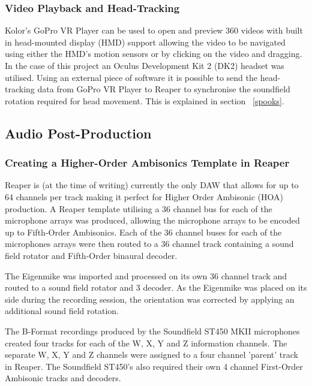 			\subsubsection{Video Playback and Head-Tracking}
				 Kolor's GoPro VR Player \cite{GoProVR} can be used to open and preview 360 videos with built in head-mounted display (HMD) support allowing the video to be navigated using either the HMD's motion sensors or by clicking on the video and dragging. In the case of this project an Oculus Development Kit 2 (DK2) \cite{OculusDK2} headset was utilised. Using an external piece of software it is possible to send the head-tracking data from GoPro VR Player to Reaper to synchronise the soundfield rotation required for head movement. This is explained in section ~\ref{spooks}.


		\subsection{Audio Post-Production}
			
			\subsubsection{Creating a Higher-Order Ambisonics Template in Reaper}

				Reaper \cite{Reaper} is (at the time of writing) currently the only DAW that allows for up to 64 channels per track making it perfect for Higher Order Ambisonic (HOA) production. A Reaper template utilising a 36 channel bus for each of the microphone arrays was produced, allowing the microphone arrays to be encoded up to Fifth-Order Ambisonics. Each of the 36 channel buses for each of the microphones arrays were then routed to a 36 channel track containing a sound field rotator and Fifth-Order binaural decoder.
				
				The Eigenmike was imported and processed on its own 36 channel track and routed to a sound field rotator and 3 decoder. As the Eigenmike was placed on its side during the recording session, the orientation was corrected by applying an additional sound field rotation.

				The B-Format recordings produced by the Soundfield ST450 MKII microphones created four tracks for each of the W, X, Y and Z information channels. The separate W, X, Y and Z channels were assigned to a four channel 'parent' track in Reaper. The Soundfield ST450's also required their own 4 channel First-Order Ambisonic tracks and decoders.\\

